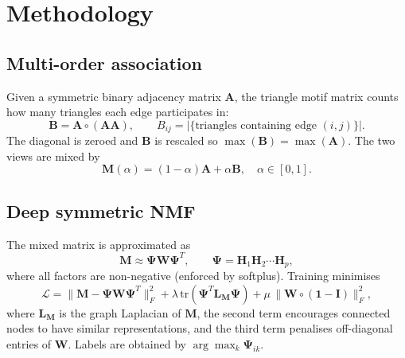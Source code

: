 \documentclass[11pt,a4paper]{article}
\begin{document}
\section{Methodology}
\subsection{Multi-order association}
Given a symmetric binary adjacency matrix $\mathbf{A}$, the triangle motif matrix counts how
many triangles each edge participates in:
\begin{equation}
\mathbf{B} = \mathbf{A}\circ(\mathbf{A}\mathbf{A}), \qquad
B_{ij} = |\{\text{triangles containing edge }(i,j)\}| .
\end{equation}
The diagonal is zeroed and $\mathbf{B}$ is rescaled so $\max(\mathbf{B})=\max(\mathbf{A})$.
The two views are mixed by
\begin{equation}
\mathbf{M}(\alpha) = (1-\alpha)\mathbf{A} + \alpha\mathbf{B},\quad \alpha\in[0,1].
\end{equation}

\subsection{Deep symmetric NMF}
The mixed matrix is approximated as
\begin{equation}
\mathbf{M}\approx \mathbf{\Psi}\mathbf{W}\mathbf{\Psi}^{T},\qquad
\mathbf{\Psi}=\mathbf{H}_1\mathbf{H}_2\cdots\mathbf{H}_p ,
\end{equation}
where all factors are non-negative (enforced by softplus). Training minimises
\begin{equation}
\mathcal{L}=\|\mathbf{M}-\mathbf{\Psi}\mathbf{W}\mathbf{\Psi}^{T}\|_F^2
+\lambda\,\mathrm{tr}(\mathbf{\Psi}^{T}\mathbf{L}_{\mathbf{M}}\mathbf{\Psi})
+\mu\,\|\mathbf{W}\circ(\mathbf{1}-\mathbf{I})\|_F^2 ,
\end{equation}
where $\mathbf{L}_{\mathbf{M}}$ is the graph Laplacian of $\mathbf{M}$, the second term
encourages connected nodes to have similar representations, and the third term penalises
off-diagonal entries of $\mathbf{W}$. Labels are obtained by $\arg\max_k \mathbf{\Psi}_{ik}$.
\end{document}

